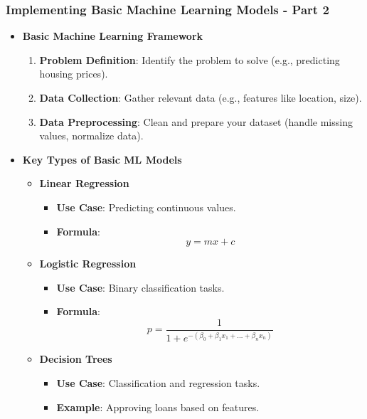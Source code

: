 \documentclass[aspectratio=169]{beamer}
\begin{document}
\begin{frame}[fragile]
    \frametitle{Implementing Basic Machine Learning Models - Part 2}
    
    \begin{itemize}
        \item \textbf{Basic Machine Learning Framework}
            \begin{enumerate}
                \item \textbf{Problem Definition}: Identify the problem to solve (e.g., predicting housing prices).
                \item \textbf{Data Collection}: Gather relevant data (e.g., features like location, size).
                \item \textbf{Data Preprocessing}: Clean and prepare your dataset (handle missing values, normalize data).
            \end{enumerate}
        \item \textbf{Key Types of Basic ML Models}
            \begin{itemize}
                \item \textbf{Linear Regression}
                    \begin{itemize}
                        \item \textbf{Use Case}: Predicting continuous values.
                        \item \textbf{Formula}: 
                        \begin{equation}
                            y = mx + c
                        \end{equation}
                    \end{itemize}
                \item \textbf{Logistic Regression}
                    \begin{itemize}
                        \item \textbf{Use Case}: Binary classification tasks.
                        \item \textbf{Formula}: 
                        \begin{equation}
                            p = \frac{1}{1 + e^{-(\beta_0 + \beta_1x_1 + \ldots + \beta_nx_n)}}
                        \end{equation}
                    \end{itemize}
                \item \textbf{Decision Trees} 
                    \begin{itemize}
                        \item \textbf{Use Case}: Classification and regression tasks.
                        \item \textbf{Example}: Approving loans based on features.
                    \end{itemize}
            \end{itemize}
    \end{itemize}
\end{frame}
\end{document}
